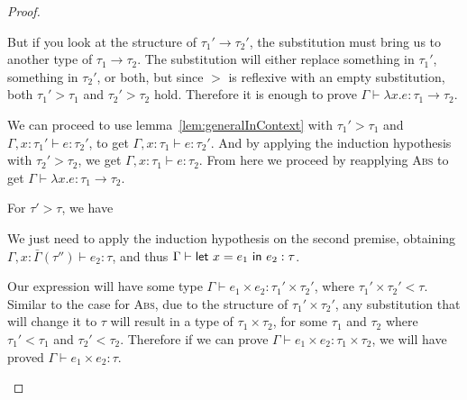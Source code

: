 \begin{proof}
\begin{description}
    But if you look at the structure of $\tau_1' \rightarrow \tau_2'$, the
    substitution must bring us to another type of
    $\tau_1 \rightarrow \tau_2$.  The substitution will either replace something in
    $\tau_1'$, something in $\tau_2'$, or both, but since $>$ is reflexive
    with an empty substitution, both $\tau_1' > \tau_1$ and
    $\tau_2' > \tau_2$ hold. Therefore it is enough to prove $\Gamma \vdash \lambda x . e :
    \tau_1 \rightarrow \tau_2$.

    We can proceed to use lemma~\ref{lem:generalInContext} with
    $\tau_1' > \tau_1$ and $\Gamma,x : \tau_1' \vdash e : \tau_2'$, to get
    $\Gamma, x : \tau_1 \vdash e : \tau_2'$.  And by applying the induction hypothesis
    with $\tau_2' > \tau_2$, we get $\Gamma, x : \tau_1 \vdash e : \tau_2$. From here we
    proceed by reapplying \textsc{Abs} to get $\Gamma \vdash \lambda x . e : \tau_1 \rightarrow
    \tau_2$.
  \item[\textmd{\boxed{\textsc{Let}}}]
    For $\tau' > \tau$, we have
    \begin{mathpar}
    \end{mathpar}
    We just need to apply the induction hypothesis on the second
    premise, obtaining
    $\Gamma, x : \bar{\Gamma}(\tau'') \vdash e_2 : \tau$, and thus
    $\Gamma \vdash \letin{x = e_1}{e_2} : \tau$.
  \item[\textmd{\boxed{\textsc{Product}}}]
    Our expression will have some type $\Gamma \vdash e_1 \times e_2 : \tau_1' \times \tau_2'$, where $\tau_1' \times
    \tau_2' < \tau$. Similar to the case for \textsc{Abs}, due to the
    structure of $\tau_1' \times \tau_2'$, any substitution that will change it
    to $\tau$ will result in a type of $\tau_1 \times \tau_2$, for some $\tau_1$ and
    $\tau_2$ where $\tau_1' < \tau_1$ and $\tau_2' < \tau_2$. 
    Therefore if we can prove $\Gamma \vdash e_1 \times e_2 : \tau_1 \times \tau_2$, we will
    have proved $\Gamma \vdash e_1 \times e_2 : \tau$.
    

\end{description}
\end{proof}
